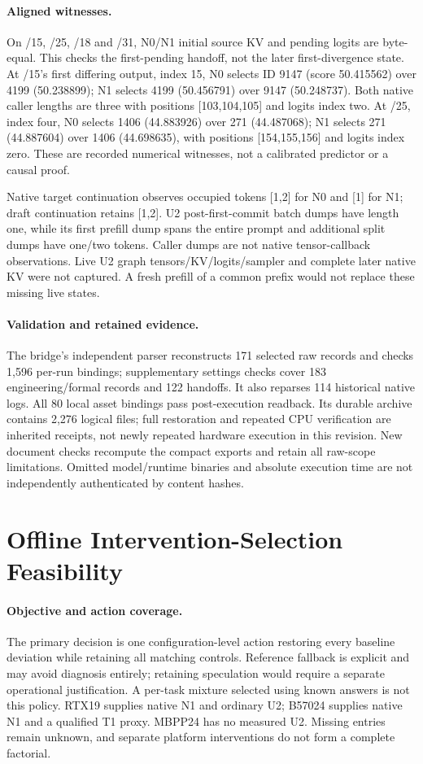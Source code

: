 \paragraph{Aligned witnesses.}
On /15, /25, /18 and /31, N0/N1 initial source KV and pending logits are byte-equal. This checks the first-pending handoff, not the later first-divergence state. At /15's first differing output, index 15, N0 selects ID 9147 (score 50.415562) over 4199 (50.238899); N1 selects 4199 (50.456791) over 9147 (50.248737). Both native caller lengths are three with positions [103,104,105] and logits index two. At /25, index four, N0 selects 1406 (44.883926) over 271 (44.487068); N1 selects 271 (44.887604) over 1406 (44.698635), with positions [154,155,156] and logits index zero. These are recorded numerical witnesses, not a calibrated predictor or a causal proof.

Native target continuation observes occupied tokens [1,2] for N0 and [1] for N1; draft continuation retains [1,2]. U2 post-first-commit batch dumps have length one, while its first prefill dump spans the entire prompt and additional split dumps have one/two tokens. Caller dumps are not native tensor-callback observations. Live U2 graph tensors/KV/logits/sampler and complete later native KV were not captured. A fresh prefill of a common prefix would not replace these missing live states.

\paragraph{Validation and retained evidence.}
The bridge's independent parser reconstructs 171 selected raw records and checks 1,596 per-run bindings; supplementary settings checks cover 183 engineering/formal records and 122 handoffs. It also reparses 114 historical native logs. All 80 local asset bindings pass post-execution readback. Its durable archive contains 2,276 logical files; full restoration and repeated CPU verification are inherited receipts, not newly repeated hardware execution in this revision. New document checks recompute the compact exports and retain all raw-scope limitations. Omitted model/runtime binaries and absolute execution time are not independently authenticated by content hashes.

\section{Offline Intervention-Selection Feasibility}
\label{app:selection}
\paragraph{Objective and action coverage.}
The primary decision is one configuration-level action restoring every baseline deviation while retaining all matching controls. Reference fallback is explicit and may avoid diagnosis entirely; retaining speculation would require a separate operational justification. A per-task mixture selected using known answers is not this policy. RTX19 supplies native N1 and ordinary U2; B57024 supplies native N1 and a qualified T1 proxy. MBPP24 has no measured U2. Missing entries remain unknown, and separate platform interventions do not form a complete factorial.

